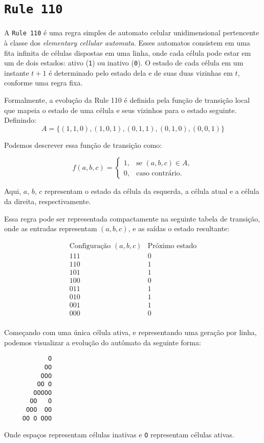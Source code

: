 \section{\texttt{Rule 110}}

A \texttt{Rule 110} é uma regra simples de automato celular
unidimensional pertencente à classe dos
\textit{elementary cellular automata}.
Esses automatos consistem em uma fita infinita de células
dispostas em uma linha, onde cada célula pode estar em um de
dois estados: ativo (\texttt{1}) ou inativo (\texttt{0}).
O estado de cada célula em um instante \( t+1 \) é determinado
pelo estado dela e de suas duas vizinhas em \( t \), conforme
uma regra fixa.

Formalmente, a evolução da Rule 110 é definida pela função de
transição local que mapeia o estado de uma célula e seus
vizinhos para o estado seguinte. Definindo:
\begin{equation*}
A = \{(1,1,0), (1,0,1),(0,1,1), (0,1,0), (0,0,1)\}
\end{equation*}

\noindent Podemos descrever essa função de transição como:

\[
f(a, b, c) =
\begin{cases}
1, & \text{se } (a, b, c) \in A, \\
0, & \text{caso contrário}.
\end{cases}
\]

Aqui, \( a \), \( b \), \( c \) representam o estado da célula
da esquerda, a célula atual e a célula da direita,
respectivamente.

Essa regra pode ser representada compactamente na seguinte
tabela de transição, onde as entradas representam
\( (a, b, c) \), e as saídas o estado resultante:

\[
\begin{array}{c|c}
\text{Configuração } (a, b, c) & \text{Próximo estado} \\
\hline
111 & 0 \\
110 & 1 \\
101 & 1 \\
100 & 0 \\
011 & 1 \\
010 & 1 \\
001 & 1 \\
000 & 0 \\
\end{array}
\]

Começando com uma única célula ativa, e representando
uma geração por linha, podemos visualizar a evolução
do autômato da seguinte forma:

\begin{verbatim}
            O 
           OO 
          OOO 
         OO O 
        OOOOO 
       OO   O 
      OOO  OO 
     OO O OOO
\end{verbatim}

Onde espaços representam células inativas e \verb|O|
representam células ativas.